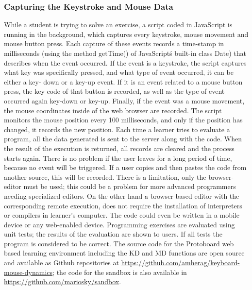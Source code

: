 \documentclass[a4paper,twoside]{article}
\begin{document}
\subsubsection{Capturing the Keystroke and Mouse Data} 
While a student is trying
to solve an exercise, a script coded in JavaScript is running in the background,
which captures every keystroke, mouse movement and mouse button press. Each
capture of these events records a time-stamp in milliseconds (using the method
getTime() of JavaScript\'s built-in class Date) that describes when the event
occurred. If the event is a keystroke, the script captures what key was
specifically pressed, and what type of event occurred, it can be either a key-
down or a key-up event. If it is an event related to a mouse button press, the
key code of that button is recorded, as well as the type of event occurred again
key-down or key-up. Finally, if the event was a mouse movement, the mouse
coordinates inside of the web browser are recorded. The script monitors the
mouse position every 100 milliseconds, and only if the position has changed, it
records the new position. Each time a learner tries to evaluate a program, all
the data generated is sent to the server along with the code. When the result of
the execution is returned, all records are cleared and the process starts again.
There is no problem if the user leaves for a long period of time, because no
event will be triggered. If a user copies and then pastes the code from another
source, this will be recorded. There is a limitation, only the browser-editor
must be used; this could be a problem for more advanced programmers needing
specialized editors.  On the other hand a browser-based editor with the
corresponding remote execution, does not require the installation of
interpreters or compilers in learner’s computer. The code could even be written
in a mobile device or any web-enabled device. Programming exercises are evaluated using unit
tests; the results of the evaluation are shown to users. If all tests the
program is considered to be correct. The source code for the Protoboard web
based learning environment including the KD and MD functions are open source and
available as Github repositories at \url{https://github.com/amherag/keyboard-mouse-dynamics}; the code for the
sandbox is also available in \url{https://github.com/mariosky/sandbox}.
\end{document}

